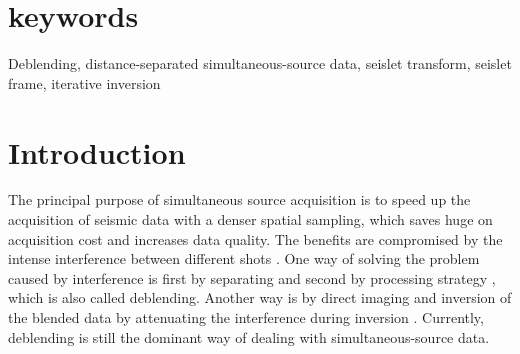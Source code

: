 \section{keywords}
Deblending, distance-separated simultaneous-source data, seislet transform, seislet frame, iterative inversion


\section{Introduction}
The principal purpose of simultaneous source acquisition is to speed up the acquisition of seismic data with a denser spatial sampling, which saves huge on acquisition cost and increases data quality. The benefits are compromised by the intense interference between different shots \cite{berkhout2008}. One way of solving the problem caused by interference is first by separating and second by processing strategy \cite{mahdad2011,yangkang20142,yangkang2014svmf,yangkang2015pnmo}, which is also called deblending. Another way is by direct imaging and inversion of the blended data by attenuating the interference during inversion \cite{verschuur2011,zhiguang2014,yangkang2015image,shuwei2015vel}. Currently, deblending is still the dominant way of dealing with simultaneous-source data.

